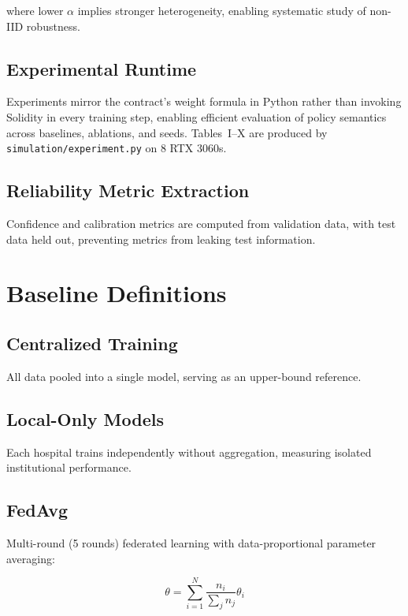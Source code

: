 \documentclass[conference]{IEEEtran}
\begin{document}
where lower $\alpha$ implies stronger heterogeneity, enabling systematic study of non-IID robustness.

\subsection{Experimental Runtime}

Experiments mirror the contract's weight formula in Python rather than invoking Solidity in every training step, enabling efficient evaluation of policy semantics across baselines, ablations, and seeds. Tables~I--X are produced by \texttt{simulation/experiment.py} on 8 RTX 3060s.

\subsection{Reliability Metric Extraction}

Confidence and calibration metrics are computed from validation data, with test data held out, preventing metrics from leaking test information.

\section{Baseline Definitions}

\subsection{Centralized Training}

All data pooled into a single model, serving as an upper-bound reference.

\subsection{Local-Only Models}

Each hospital trains independently without aggregation, measuring isolated institutional performance.

\subsection{FedAvg}

Multi-round (5 rounds) federated learning with data-proportional parameter averaging:

\begin{equation}
\theta = \sum_{i=1}^{N} \frac{n_i}{\sum_j n_j} \theta_i
\end{equation}
\end{document}
